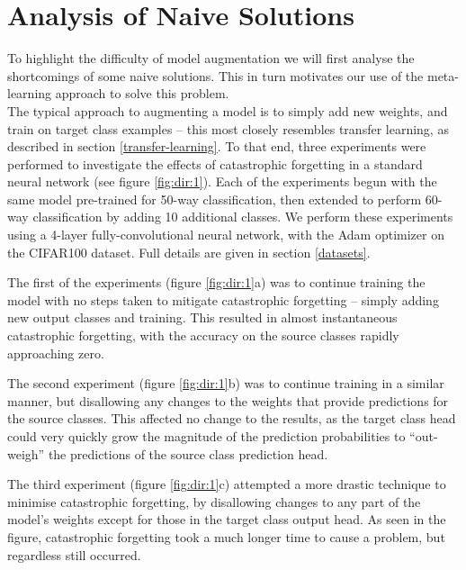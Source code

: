 \documentclass{report}
\begin{document}
\section{Analysis of Naive Solutions}
To highlight the difficulty of model augmentation we will first analyse the shortcomings of some naive solutions. This in turn motivates our use of the meta-learning approach to solve this problem. \\
The typical approach to augmenting a model is to simply add new weights, and train on target class examples -- this most closely resembles transfer learning, as described in section \ref{transfer-learning}. To that end, three experiments were performed to investigate the effects of catastrophic forgetting in a standard neural network (see figure \ref{fig:dir:1}). Each of the experiments begun with the same model pre-trained for 50-way classification, then extended to perform 60-way classification by adding 10 additional classes. We perform these experiments using a 4-layer fully-convolutional neural network, with the Adam optimizer on the CIFAR100 dataset. Full details are given in section \ref{datasets}. \par
The first of the experiments (figure \ref{fig:dir:1}a) was to continue training the model with no steps taken to mitigate catastrophic forgetting -- simply adding new output classes and training. This resulted in almost instantaneous catastrophic forgetting, with the accuracy on the source classes rapidly approaching zero. \par
The second experiment (figure \ref{fig:dir:1}b) was to continue training in a similar manner, but disallowing any changes to the weights that provide predictions for the source classes. This affected no change to the results, as the target class head could very quickly grow the magnitude of the prediction probabilities to ``out-weigh'' the predictions of the source class prediction head. \par
The third experiment (figure \ref{fig:dir:1}c) attempted a more drastic technique to minimise catastrophic forgetting, by disallowing changes to any part of the model's weights except for those in the target class output head. As seen in the figure, catastrophic forgetting took a much longer time to cause a problem, but regardless still occurred. \par
\end{document}
